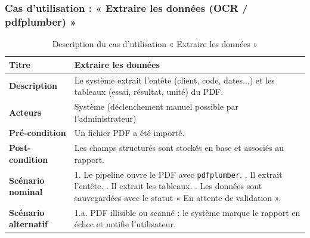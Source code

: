 \subsubsection{Cas d'utilisation : « Extraire les données (OCR / pdfplumber) »}
\begin{table}[h!]
\centering
\renewcommand{\arraystretch}{1.3}
\begin{tabularx}{\textwidth}{|l|X|}
\hline
\textbf{Titre} & Extraire les données \\ \hline
\textbf{Description} & Le système extrait l'entête (client, code, dates...) et les
tableaux (essai, résultat, unité) du PDF. \\ \hline
\textbf{Acteurs} & Système (déclenchement manuel possible par l'administrateur) \\ \hline
\textbf{Pré-condition} & Un fichier PDF a été importé. \\ \hline
\textbf{Post-condition} & Les champs structurés sont stockés en base et associés au
rapport. \\ \hline
\textbf{Scénario nominal} &
1. Le pipeline ouvre le PDF avec \texttt{pdfplumber}. \newline
2. Il extrait l'entête. \newline
3. Il extrait les tableaux. \newline
4. Les données sont sauvegardées avec le statut « En attente de validation ». \\ \hline
\textbf{Scénario alternatif} &
1.a. PDF illisible ou scanné : le système marque le rapport en échec et notifie
l'utilisateur. \\ \hline
\end{tabularx}
\caption{Description du cas d'utilisation « Extraire les données »}
\end{table}

